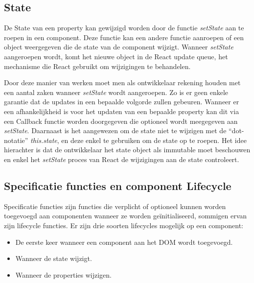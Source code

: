 	\subsection{State}
		
		De State van een property kan gewijzigd worden door de functie \emph{setState} aan te roepen in een component. Deze functie kan een andere functie aanroepen of een object weergegeven die de state van de component wijzigt. Wanneer \emph{setState} aangeroepen wordt, komt het nieuwe object in de React update queue, het mechanisme die React gebruikt om wijzigingen te behandelen.
		
		Door deze manier van werken moet men als ontwikkelaar rekening houden met een aantal zaken wanneer \emph{setState} wordt aangeroepen. Zo is er geen enkele garantie dat de updates in een bepaalde volgorde zullen gebeuren. Wanneer er een afhankelijkheid is voor het updaten van een bepaalde property kan dit via een Callback functie worden doorgegeven die optioneel wordt meegegeven aan \emph{setState}. Daarnaast is het aangewezen om de state niet te wijzigen met de ``dot-notatie'' \emph{this.state}, en deze enkel te gebruiken om de state op te roepen. Het idee hierachter is dat de ontwikkelaar het state object als immutable moet beschouwen en enkel het \emph{setState} proces van React de wijzigingen aan de state controleert.
	
	\subsection{Specificatie functies en component Lifecycle}
		
		Specificatie functies zijn functies die verplicht of optioneel kunnen worden toegevoegd aan componenten wanneer ze worden geïnitialiseerd, sommigen ervan zijn lifecycle functies. Er zijn drie soorten lifecycles mogelijk op een component:
		
		\begin{itemize}
			\item De eerste keer wanneer een component aan het DOM wordt toegevoegd.
			\item Wanneer de state wijzigt.
			\item Wanneer de properties wijzigen.
		\end{itemize}
		
